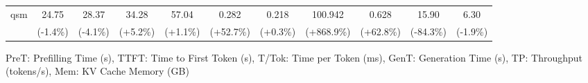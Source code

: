 \begin{table}[t]
{\begin{tabular}{l|cccccccccc}
    qsm & 24.75 & 28.37 & 34.28 & 57.04 & 0.282 & 0.218 & 100.942 & 0.628 & 15.90 & 6.30 \\
     & {\tiny\color{green!60!black}(-1.4\%)} & {\tiny\color{green!60!black}(-4.1\%)} & {\tiny\color{red!70!black}(+5.2\%)} & {\tiny\color{red!70!black}(+1.1\%)} & {\tiny\color{red!70!black}(+52.7\%)} & {\tiny\color{red!70!black}(+0.3\%)} & {\tiny\color{red!70!black}(+868.9\%)} & {\tiny\color{red!70!black}(+62.8\%)} & {\tiny\color{red!70!black}(-84.3\%)} & {\tiny\color{green!60!black}(-1.9\%)} \\
    \bottomrule
    \end{tabular}%
    }
    \vspace{0.1cm}
    \footnotesize{PreT: Prefilling Time (s), TTFT: Time to First Token (s), T/Tok: Time per Token (ms), GenT: Generation Time (s), TP: Throughput (tokens/s), Mem: KV Cache Memory (GB)}
\end{table}



